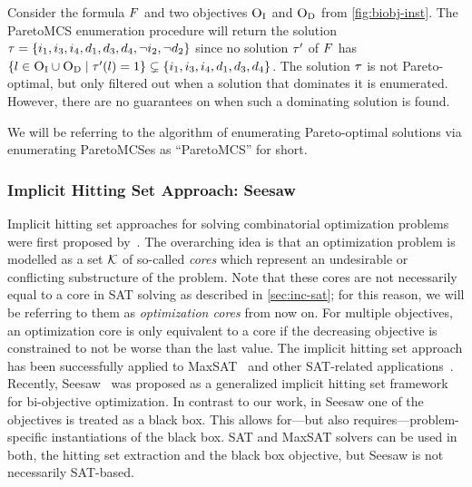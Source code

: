 \begin{example}\label{ex:MCS}
  Consider the formula $F$ and two objectives $\textsc{O}_{\text{I}}$ and $\textsc{O}_{\text{D}}$ from \cref{fig:biobj-inst}.
  The ParetoMCS enumeration procedure will return the solution $\tau = \{i_1,\allowbreak i_3,\allowbreak i_4,\allowbreak d_1,\allowbreak d_3,\allowbreak d_4,\allowbreak \lnot i_2,\allowbreak \lnot d_2\}$ since no solution $\tau'$ of $F$ has $\{l \in \textsc{O}_{\text{I}} \cup \textsc{O}_{\text{D}} \mid  \tau'(l) = 1\} \subsetneq \{i_1, i_3, i_4, d_1, d_3, d_4\}$.
  The solution $\tau$ is not Pareto-optimal, but only filtered out when a solution that dominates it is enumerated.
  However, there are no guarantees on when such a dominating solution is found. 
\end{example}

We will be referring to the algorithm of enumerating Pareto-optimal solutions via enumerating ParetoMCSes as ``ParetoMCS'' for short.

\subsubsection{Implicit Hitting Set Approach: Seesaw\label{sec:seesaw}}

Implicit hitting set approaches for solving combinatorial optimization problems were first proposed by~\textcite{DBLP:journals/ior/Moreno-CentenoK13}.
The overarching idea is that an optimization problem is modelled as a set $\mathcal{K}$ of so-called \emph{cores} which represent an undesirable or conflicting substructure of the problem.
Note that these cores are not necessarily equal to a core in SAT solving as described in \cref{sec:inc-sat};
for this reason, we will be referring to them as \emph{optimization cores} from now on.
For multiple objectives, an optimization core is only equivalent to a core if the decreasing objective is constrained to not be worse than the last value.
The implicit hitting set approach has been successfully applied to MaxSAT~\autocite{DBLP:conf/cp/DaviesB13,DBLP:conf/sat/DaviesB13,DBLP:conf/cp/DaviesB11,DBLP:conf/sat/BergBP20} and other SAT-related applications~\autocite{DBLP:conf/ecai/IgnatievMM16,DBLP:conf/cp/IgnatievPLM15,DBLP:conf/kr/SaikkoWJ16}.
Recently, Seesaw~\autocite{DBLP:conf/cp/JanotaMSM21} was proposed as a generalized implicit hitting set framework for bi-objective optimization.
In contrast to our work, in Seesaw one of the objectives is treated as a black box.
This allows for---but also requires---problem-specific instantiations of the black box.
SAT and MaxSAT solvers can be used in both, the hitting set extraction and the black box objective, but Seesaw is not necessarily SAT-based.

